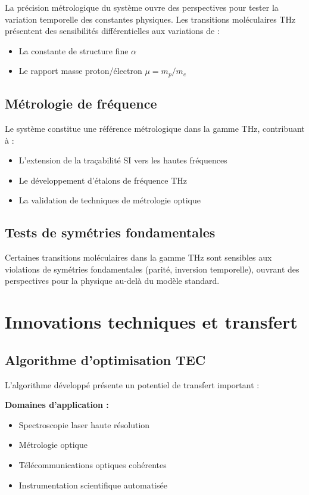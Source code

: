 La précision métrologique du système ouvre des perspectives pour tester la variation temporelle des constantes physiques. Les transitions moléculaires THz présentent des sensibilités différentielles aux variations de :
\begin{itemize}
    \item La constante de structure fine $\alpha$
    \item Le rapport masse proton/électron $\mu = m_p/m_e$
\end{itemize}

\subsection{Métrologie de fréquence}

Le système constitue une référence métrologique dans la gamme THz, contribuant à :
\begin{itemize}
    \item L'extension de la traçabilité SI vers les hautes fréquences
    \item Le développement d'étalons de fréquence THz
    \item La validation de techniques de métrologie optique
\end{itemize}

\subsection{Tests de symétries fondamentales}

Certaines transitions moléculaires dans la gamme THz sont sensibles aux violations de symétries fondamentales (parité, inversion temporelle), ouvrant des perspectives pour la physique au-delà du modèle standard.

\section{Innovations techniques et transfert}

\subsection{Algorithme d'optimisation TEC}

L'algorithme développé présente un potentiel de transfert important :

\textbf{Domaines d'application :}
\begin{itemize}
    \item Spectroscopie laser haute résolution
    \item Métrologie optique
    \item Télécommunications optiques cohérentes
    \item Instrumentation scientifique automatisée
\end{itemize}

